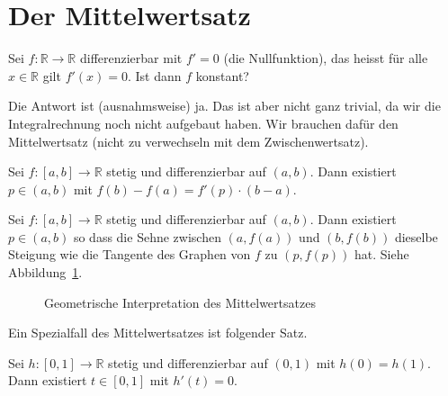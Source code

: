 \documentclass[../main.tex]{subfiles}
\begin{document}
\section{Der Mittelwertsatz}
\begin{question}
  Sei $f \colon \mathbb{R} \to \mathbb{R}$ 
  differenzierbar mit $f' = 0$ (die Nullfunktion),
  das heisst für alle $x \in \mathbb{R}$ gilt
  $f'(x) = 0$. Ist dann $f$ konstant?
\end{question}

Die Antwort ist (ausnahmsweise) ja.
Das ist aber nicht ganz trivial, da wir
die Integralrechnung noch nicht aufgebaut haben.
Wir brauchen dafür den Mittelwertsatz
(nicht zu verwechseln mit dem Zwischenwertsatz).

\begin{meanvalue}
  Sei $f \colon [a, b] \to \mathbb{R}$ 
  stetig und differenzierbar auf $(a, b)$.
  Dann existiert $p \in (a, b)$ mit $f(b) - f(a)
  = f'(p) \cdot (b-a)$.
\end{meanvalue}

\begin{geometric}
  Sei $ f \colon [a, b] \to \mathbb{R}$ stetig
  und differenzierbar auf $(a, b)$.
  Dann existiert $p \in (a, b)$ so dass
  die Sehne zwischen $(a, f(a))$ und
  $(b, f(b))$ dieselbe Steigung
  wie die Tangente des Graphen von $f$ zu $
  (p, f(p))$ hat. Siehe Abbildung~\ref{fig:meanvalue}.
\end{geometric}

\begin{figure}[htb]
  \centering
  
  \caption{Geometrische Interpretation
  des Mittelwertsatzes}%
  \label{fig:meanvalue}
\end{figure}

Ein Spezialfall des Mittelwertsatzes ist folgender Satz.

\begin{rolle}
  Sei $h \colon [0, 1] \to \mathbb{R}$ stetig
  und differenzierbar auf $(0, 1)$ 
  mit $h(0) = h(1)$.
  Dann existiert $t \in [0, 1]$ 
  mit $h'(t) = 0$.
\end{rolle}
\end{document}
